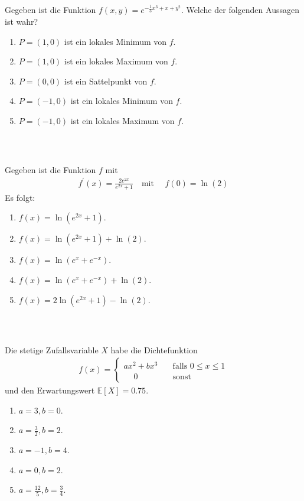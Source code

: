\subsection*{}
Gegeben ist die Funktion $ f(x,y) = e^{-\frac{1}{3} x^3 + x +y^2 } $.
Welche der folgenden Aussagen ist wahr?
\renewcommand{\labelenumi}{(\alph{enumi})}
\begin{enumerate}
\item 
$ P = (1,0) $ ist ein lokales Minimum von $ f $.
\item
$ P = (1,0) $ ist ein lokales Maximum von $ f $.
\item
$ P = (0,0) $ ist ein Sattelpunkt von $ f $.
\item 
$ P = (-1,0) $ ist ein lokales Minimum von $ f $.
\item
$ P = (-1,0) $ ist ein lokales Maximum von $ f $.
\end{enumerate}
\ \\
\subsection*{}
Gegeben ist die Funktion $ f $ mit 
\begin{align*}
	f^\prime(x) = \frac{2 e^{2x}}{e^{2x} + 1} \quad \textrm{mit } \quad f(0) = \ln(2)
\end{align*}
Es folgt:
\renewcommand{\labelenumi}{(\alph{enumi})}
\begin{enumerate}
	\item 
	$f(x) = \ln(e^{2x} +1) $.
	\item
	$f(x) = \ln(e^{2x} +1) + \ln(2) $.
	\item
	$f(x) = \ln(e^{x} +e^{-x}) $.
	\item
	$f(x) = \ln(e^{x} +e^{-x}) + \ln(2) $.	
	\item
	$f(x) = 2 \ln(e^{2x} +1) - \ln(2) $.
\end{enumerate}
\ \\
\subsection*{}
Die stetige Zufallsvariable $ X $ habe die Dichtefunktion
\begin{align*}
	f(x) =
	\begin{cases}
		ax^2 + bx^3 \quad &\textrm{falls } 0 \leq x \leq 1\\
		\quad  \  0 \ \ &\textrm{sonst}
	\end{cases}
\end{align*}
und den Erwartungswert $ \mathbb{E}[X] = 0.75 $.
\renewcommand{\labelenumi}{(\alph{enumi})}
\begin{enumerate}
	\item 
	$a= 3,b=0$.
	\item
	$a= \frac{3}{2},b=2$.
	\item
	$a= -1,b=4$.
	\item
	$a= 0,b=2$.
	\item
	$a= \frac{12}{5},b=\frac{3}{4}$.	
\end{enumerate}
\ \\

